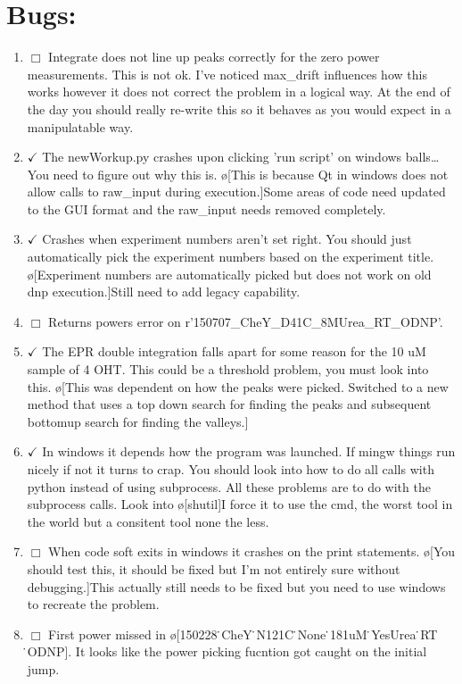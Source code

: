 \documentclass[10pt]{book}
\begin{document}
\section{Bugs:}
\begin{enumerate}
    \item $\Box$ Integrate does not line up peaks correctly for the zero power measurements. This is not ok. I've noticed max_drift influences how this works however it does not correct the problem in a logical way. At the end of the day you should really re-write this so it behaves as you would expect in a manipulatable way.
    \item $\checkmark$ The newWorkup.py crashes upon clicking 'run script' on windows balls\ldots You need to figure out why this is. \o[This is because Qt in windows does not allow calls to raw_input during execution.]{Some areas of code need updated to the GUI format and the raw_input needs removed completely.}
    \item $\checkmark$ Crashes when experiment numbers aren't set right. You should just automatically pick the experiment numbers based on the experiment title. \o[Experiment numbers are automatically picked but does not work on old dnp execution.]{Still need to add legacy capability.}
    \item $\Box$ Returns powers error on r'150707_CheY_D41C_8MUrea_RT_ODNP'.
    \item $\checkmark$ The EPR double integration falls apart for some reason for the 10 uM sample of 4 OHT. This could be a threshold problem, you must look into this. \o[This was dependent on how the peaks were picked. Switched to a new method that uses a top down search for finding the peaks and subsequent bottomup search for finding the valleys.]{}
    \item $\checkmark$ In windows it depends how the program was launched. If mingw things run nicely if not it turns to crap. You should look into how to do all calls with python instead of using subprocess. All these problems are to do with the subprocess calls. Look into \o[shutil]{I force it to use the cmd, the worst tool in the world but a consitent tool none the less.}
    \item $\Box$ When code soft exits in windows it crashes on the print statements. \o[You should test this, it should be fixed but I'm not entirely sure without debugging.]{This actually still needs to be fixed but you need to use windows to recreate the problem.}
    \item $\Box$ First power missed in \o[150228 ̇CheY ̇N121C ̇None ̇181uM ̇YesUrea ̇RT ̇ODNP]{}. It looks like the power picking fucntion got caught on the initial jump.

\end{enumerate}
\end{document}

